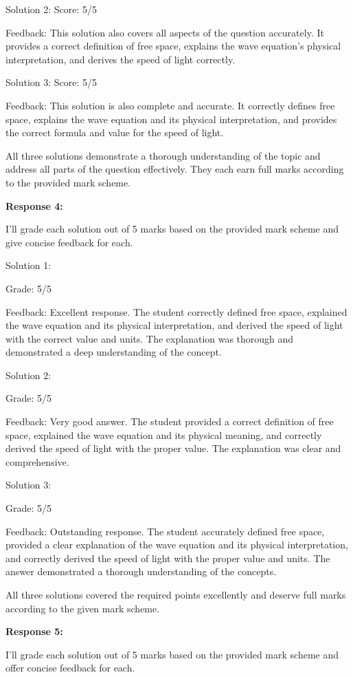 \documentclass[a4paper,11pt]{article}
\begin{document}
Solution 2:
Score: 5/5

Feedback: This solution also covers all aspects of the question accurately. It provides a correct definition of free space, explains the wave equation's physical interpretation, and derives the speed of light correctly.

Solution 3:
Score: 5/5

Feedback: This solution is also complete and accurate. It correctly defines free space, explains the wave equation and its physical interpretation, and provides the correct formula and value for the speed of light.

All three solutions demonstrate a thorough understanding of the topic and address all parts of the question effectively. They each earn full marks according to the provided mark scheme.

\bigskip
\textbf{Response 4:}

I'll grade each solution out of 5 marks based on the provided mark scheme and give concise feedback for each.

Solution 1:

Grade: 5/5

Feedback: Excellent response. The student correctly defined free space, explained the wave equation and its physical interpretation, and derived the speed of light with the correct value and units. The explanation was thorough and demonstrated a deep understanding of the concept.

Solution 2:

Grade: 5/5

Feedback: Very good answer. The student provided a correct definition of free space, explained the wave equation and its physical meaning, and correctly derived the speed of light with the proper value. The explanation was clear and comprehensive.

Solution 3:

Grade: 5/5

Feedback: Outstanding response. The student accurately defined free space, provided a clear explanation of the wave equation and its physical interpretation, and correctly derived the speed of light with the proper value and units. The answer demonstrated a thorough understanding of the concepts.

All three solutions covered the required points excellently and deserve full marks according to the given mark scheme.

\bigskip
\textbf{Response 5:}

I'll grade each solution out of 5 marks based on the provided mark scheme and offer concise feedback for each.
\end{document}
